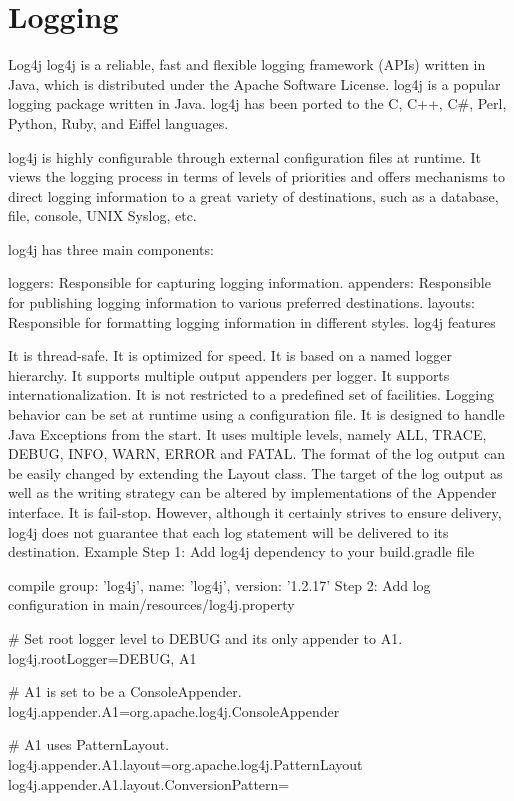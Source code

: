 \section{Logging}

Log4j
log4j is a reliable, fast and flexible logging framework (APIs) written in Java, which is distributed under the Apache Software License. log4j is a popular logging package written in Java. log4j has been ported to the C, C++, C#, Perl, Python, Ruby, and Eiffel languages.

log4j is highly configurable through external configuration files at runtime. It views the logging process in terms of levels of priorities and offers mechanisms to direct logging information to a great variety of destinations, such as a database, file, console, UNIX Syslog, etc.

log4j has three main components:

loggers: Responsible for capturing logging information.
appenders: Responsible for publishing logging information to various preferred destinations.
layouts: Responsible for formatting logging information in different styles.
log4j features

It is thread-safe.
It is optimized for speed.
It is based on a named logger hierarchy.
It supports multiple output appenders per logger.
It supports internationalization.
It is not restricted to a predefined set of facilities.
Logging behavior can be set at runtime using a configuration file.
It is designed to handle Java Exceptions from the start.
It uses multiple levels, namely ALL, TRACE, DEBUG, INFO, WARN, ERROR and FATAL.
The format of the log output can be easily changed by extending the Layout class.
The target of the log output as well as the writing strategy can be altered by implementations of the Appender interface.
It is fail-stop. However, although it certainly strives to ensure delivery, log4j does not guarantee that each log statement will be delivered to its destination.
Example
Step 1: Add log4j dependency to your build.gradle file

compile group: 'log4j', name: 'log4j', version: '1.2.17'
Step 2: Add log configuration in main/resources/log4j.property

# Set root logger level to DEBUG and its only appender to A1.
log4j.rootLogger=DEBUG, A1

# A1 is set to be a ConsoleAppender.
log4j.appender.A1=org.apache.log4j.ConsoleAppender

# A1 uses PatternLayout.
log4j.appender.A1.layout=org.apache.log4j.PatternLayout
log4j.appender.A1.layout.ConversionPattern=%

